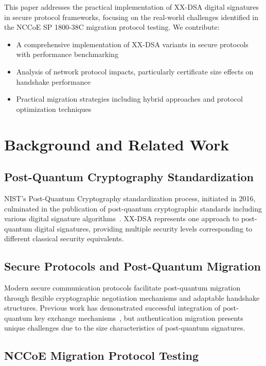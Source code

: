 \documentclass[journal=tches,final]{iacrtrans}
\begin{document}
This paper addresses the practical implementation of XX-DSA digital signatures in secure protocol frameworks, focusing on the real-world challenges identified in the NCCoE SP 1800-38C migration protocol testing. We contribute:

\begin{itemize}
    \item A comprehensive implementation of XX-DSA variants in secure protocols with performance benchmarking
    \item Analysis of network protocol impacts, particularly certificate size effects on handshake performance
    \item Practical migration strategies including hybrid approaches and protocol optimization techniques
\end{itemize}


\section{Background and Related Work}

\subsection{Post-Quantum Cryptography Standardization}

NIST's Post-Quantum Cryptography standardization process, initiated in 2016, culminated in the publication of post-quantum cryptographic standards including various digital signature algorithms~\cite{NIST-PQC-Standards}. XX-DSA represents one approach to post-quantum digital signatures, providing multiple security levels corresponding to different classical security equivalents.

\subsection{Secure Protocols and Post-Quantum Migration}

Modern secure communication protocols facilitate post-quantum migration through flexible cryptographic negotiation mechanisms and adaptable handshake structures. Previous work has demonstrated successful integration of post-quantum key exchange mechanisms~\cite{Kampanakis2020, Sikeridis2020}, but authentication migration presents unique challenges due to the size characteristics of post-quantum signatures.

\subsection{NCCoE Migration Protocol Testing}
\end{document}
